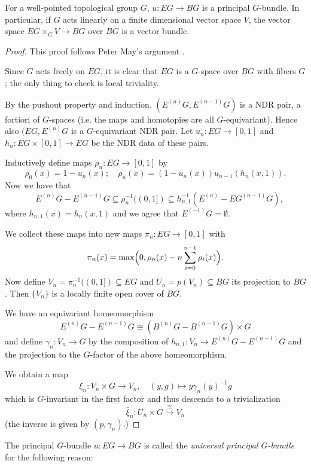 \documentclass[a4paper,openany]{scrbook}
\begin{document}
\begin{lemma}
For a well-pointed topological group $G$, $u\colon EG \to BG$ is a principal $G$-bundle. In particular, if $G$ acts linearly on a finite dimensional vector space $V$, the vector space $EG \times_G V \to BG$ over $BG$ is a vector bundle.
\end{lemma}
\begin{proof}
This proof follows Peter May's argument \cite[Theorem~8.2]{may:classifying-spaces}.

Since $G$ acts freely on $EG$, it is clear that $EG$ is a $G$-space over $BG$ with fibers $G$; the only thing to check is local triviality.

By the pushout property and induction, $(E^{(n)}G,E^{(n-1)}G)$ is a NDR pair, a fortiori of $G$-spaces (i.e. the maps and homotopies are all $G$-equivariant). Hence also $(EG,E^{(n)}G$ is a $G$-equivariant NDR pair. Let $u_n\colon EG \to [0,1]$ and $h_n\colon EG \times [0,1] \to EG$ be the NDR data of these pairs.

Inductively define maps $\rho_n\colon EG \to [0,1]$ by
\[
\rho_0(x) = 1-u_n(x); \quad \rho_n(x) = (1-u_n(x))u_{n-1}(h_n(x,1)).
\]
Now we have that
\[
\quad E^{(n)}G-E^{(n-1)}G \subseteq \rho_n^{-1}((0,1]) \subseteq h_{n,1}^{-1}(E^{(n)}-EG^{(n-1)}G),
\]
where $h_{n,1}(x) = h_n(x,1)$ and we agree that $E^{(-1)}G = \emptyset$.

We collect these maps into new maps $\pi_n\colon EG \to [0,1]$ with
\[
\pi_n(x) = \max\Bigl(0,\rho_n(x)-n\sum_{i=0}^{n-1}\rho_i(x)\Bigr).
\]
Now define $V_n = \pi_n^{-1}((0,1]) \subseteq EG $ and $U_n = p(V_n) \subseteq BG$ its projection to $BG$. Then $\{V_n\}$ is a locally finite open cover of $BG$.

We have an equivariant homeomorphism
\[
E^{(n)}G - E^{(n-1)}G \cong (B^{(n)}G - B^{(n-1)}G) \times G
\]
and define $\gamma_n\colon V_n \to G$ by the composition of $h_{n,1}\colon V_n \to E^{(n)}G-E^{(n-1)}G$ and the projection to the $G$-factor of the above homeomorphism.

We obtain a map 
\[
\xi_n\colon V_n \times G \to V_n, \quad (y,g) \mapsto y \gamma_n(y)^{-1}g
\]
which is $G$-invariant in the first factor and thus descends to a trivialization
\[
\bar\xi_n\colon U_n \times G \xrightarrow{\cong} V_n
\]
(the inverse is given by $(p,\gamma_n)$.)
\end{proof}

The principal $G$-bundle $u\colon EG \to BG$ is called the \emph{universal principal $G$-bundle} for the following reason:
\end{document}
